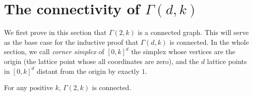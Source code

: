 \section{The connectivity of $\Gamma(d,k)$}\label{sec.conect}

We first prove in this section that $\Gamma(2,k)$ is a connected graph. This will serve as the base case for the inductive proof that $\Gamma(d,k)$ is connected. In the whole section, we call \emph{corner simplex} of $[0,k]^d$ the simplex whose vertices are the origin (the lattice point whose all coordinates are zero), and the $d$ lattice points in $[0,k]^d$ distant from the origin by exactly $1$.

\begin{theorem}\label{thm.Connec2}
For any positive $k$, $\Gamma(2,k)$ is connected.
\end{theorem}
